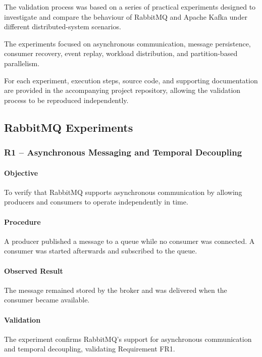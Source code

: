 \documentclass{scrartcl}
\begin{document}
The validation process was based on a series of practical experiments designed to investigate and compare the behaviour of RabbitMQ and Apache Kafka under different distributed-system scenarios.

The experiments focused on asynchronous communication, message persistence, consumer recovery, event replay, workload distribution, and partition-based parallelism.

For each experiment, execution steps, source code, and supporting documentation are provided in the accompanying project repository, allowing the validation process to be reproduced independently.

\subsection{RabbitMQ Experiments}

\subsubsection{R1 -- Asynchronous Messaging and Temporal Decoupling}

\paragraph{Objective}

To verify that RabbitMQ supports asynchronous communication by allowing producers and consumers to operate independently in time.

\paragraph{Procedure}

A producer published a message to a queue while no consumer was connected. A consumer was started afterwards and subscribed to the queue.

\paragraph{Observed Result}

The message remained stored by the broker and was delivered when the consumer became available.

\paragraph{Validation}

The experiment confirms RabbitMQ's support for asynchronous communication and temporal decoupling, validating Requirement FR1.
\end{document}
